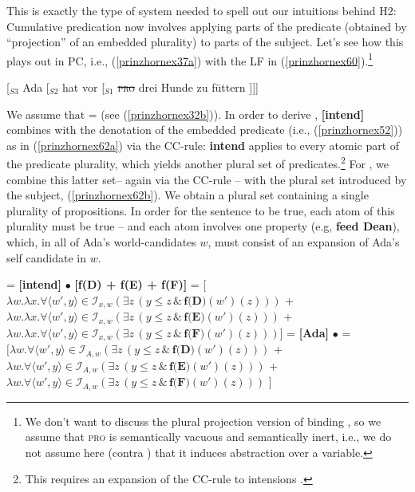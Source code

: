 \documentclass[output=paper]{langscibook}
\begin{document}
This is exactly the type of system needed to spell out our intuitions behind H2: Cumulative predication now involves applying parts of the predicate (obtained by “projection” of an embedded plurality) to parts of the subject. Let's see how this plays out in PC, i.e., (\ref{prinzhornex37a}) with the LF in (\ref{prinzhornex60}).\footnote{We don't want to discuss the  plural projection version of binding \citep{Haslinger:2020d}, so we assume that \textsc{pro} is semantically vacuous and semantically inert, i.e., we do not assume here (contra \citealt{Heim:1998}) that it induces abstraction over a variable.} 

\ea  \label{prinzhornex60} [$_{S3}$ Ada [$_{S2}$ hat vor [$_{S1}$ \sout{\textsc{pro}} drei Hunde zu füttern ]]]  \z

We assume that  =  (see (\ref{prinzhornex32b})). In order to derive ,  \textbf{[intend]} combines with the denotation of the embedded predicate (i.e., (\ref{prinzhornex52})) as in (\ref{prinzhornex62a}) via the CC-rule: \textbf{intend} applies to every atomic part of the predicate plurality, which yields another plural set of predicates.\footnote{This requires an expansion of the CC-rule to  intensions \citep{Schmitt:2019a}.} For , we combine this latter set-- again via the CC-rule -- with the plural set introduced by the subject, (\ref{prinzhornex62b}). We obtain a plural set containing a single plurality of propositions. In order for the sentence to be true, each atom of this plurality must be true -- and each atom involves one property (e.g, \textbf{feed Dean}), which, in all of Ada's world-candidates $w$, must consist of an expansion of Ada's self candidate in $w$.

\ea
\ea  {} = \textbf{[intend]} $\bullet$ \textbf{[f(D) + f(E) + f(F)]} = 
 [$\lambda w. \lambda x. \forall \langle w' ,y\rangle \in \mathcal{I}_{x,w} (\exists  z \,(y \le z\, \& \,\textbf{f(D)}(w')(z)))$ +
 $\lambda w. \lambda x. \forall \langle w' ,y\rangle \in \mathcal{I}_{x,w} (\exists  z \,(y \le z\, \& \,\textbf{f(E)}(w')(z)))$ +
 $\lambda w. \lambda x. \forall \langle w' ,y \rangle \in \mathcal{I}_{x,w} (\exists  z \,(y \le z\, \& \,\textbf{f(F)}(w')(z)))$]
\label{prinzhornex62a}
\ex {} = \textbf{[Ada]} $\bullet$  = \\
 $[\lambda w.  \forall \langle w' ,y \rangle \in \mathcal{I}_{A,w} (\exists  z \,(y \le z\, \& \,\textbf{f(D)}(w')(z)))$ +
 $\lambda w.  \forall \langle w' ,y\rangle \in \mathcal{I}_{A,w} (\exists  z \,(y \le z\, \& \,\textbf{f(E)}(w')(z)))$ +
 $\lambda w.  \forall \langle w' ,y \rangle \in \mathcal{I}_{A,w} (\exists  z \,(y \le z\, \& \,\textbf{f(F)}(w')(z)))$ ]
\label{prinzhornex62b}
\z\z
\end{document}
